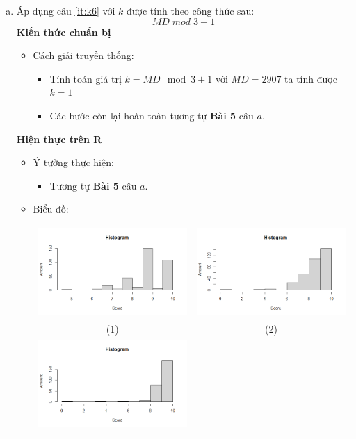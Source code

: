 \documentclass[a4paper]{article}
\theoremstyle{definition}
\begin{document}
\begin{enumerate}[a)]
    
    \bf\item Áp dụng câu \ref{it:k6} với $k$ được tính theo công thức sau: $$MD \; mod \; 3 + 1  $$
    \bf Kiến thức chuẩn bị\normalfont
    \begin{itemize}
        \item Cách giải truyền thống:
        \begin{itemize}
            \item Tính toán giá trị $k = MD\mod{3} + 1$ với $MD = 2907$ ta tính được $k = 1$
            \item Các bước còn lại hoàn toàn tương tự \textbf{Bài 5} câu $a$.
        \end{itemize}
    \end{itemize}
    \bf Hiện thực trên R\normalfont
    \begin{itemize}
        \item Ý tưởng thực hiện:
        \begin{itemize}
            \item Tương tự \textbf{Bài 5} câu $a$.
        \end{itemize}
        \item Biểu đồ:\\
        \begin{center}
            \begin{tabular}{c c}
                 \includegraphics[width = 6.9cm]{Images/img5-2-1.png} & \includegraphics[width = 6.9cm]{Images/img5-2-2.png} \\
                 (1) & (2) \\
                 \includegraphics[width = 6.9cm]{Images/img5-2-3.png} &

\end{tabular}
\end{center}
\end{itemize}
\end{enumerate}
\end{document}
